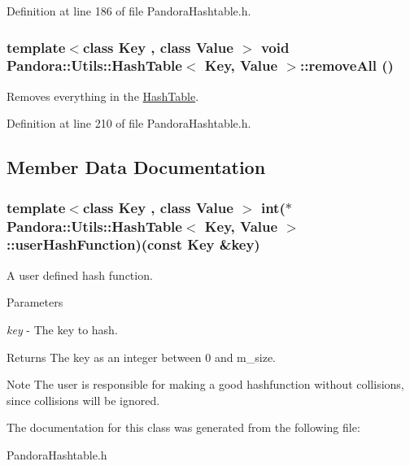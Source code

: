 Definition at line 186 of file PandoraHashtable.h.\hypertarget{classPandora_1_1Utils_1_1HashTable_af541b0c8a7ababea86db5cfda3da0a2e}{
\subsubsection[{removeAll}]{\setlength{\rightskip}{0pt plus 5cm}template$<$class Key , class Value $>$ void {\bf Pandora::Utils::HashTable}$<$ Key, Value $>$::removeAll ()}}
\label{classPandora_1_1Utils_1_1HashTable_af541b0c8a7ababea86db5cfda3da0a2e}


Removes everything in the \hyperlink{classPandora_1_1Utils_1_1HashTable}{HashTable}. 

Definition at line 210 of file PandoraHashtable.h.

\subsection{Member Data Documentation}
\hypertarget{classPandora_1_1Utils_1_1HashTable_a88e480f18940fcecb6d1f8b034986c6d}{
\subsubsection[{userHashFunction}]{\setlength{\rightskip}{0pt plus 5cm}template$<$class Key , class Value $>$ int($\ast$ {\bf Pandora::Utils::HashTable}$<$ Key, Value $>$::{\bf userHashFunction})(const Key \&key)}}
\label{classPandora_1_1Utils_1_1HashTable_a88e480f18940fcecb6d1f8b034986c6d}


A user defined hash function. 
\begin{DoxyParams}{Parameters}
\item[{\em key}]-\/ The key to hash. \end{DoxyParams}
\begin{DoxyReturn}{Returns}
The key as an integer between 0 and m\_\-size. 
\end{DoxyReturn}
\begin{DoxyNote}{Note}
The user is responsible for making a good hashfunction without collisions, since collisions will be ignored. 
\end{DoxyNote}


The documentation for this class was generated from the following file:\begin{DoxyCompactItemize}
\item 
PandoraHashtable.h\end{DoxyCompactItemize}
